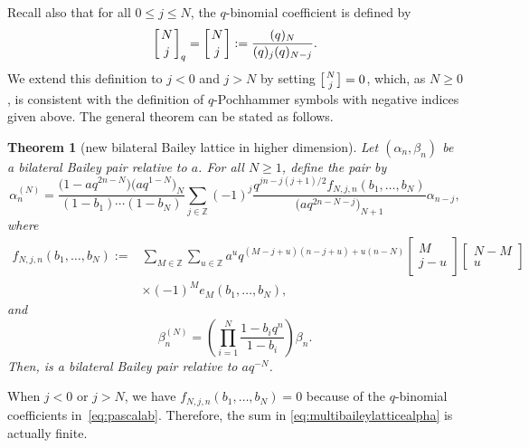 \documentclass[pdftex]{sigma}
\numberwithin{equation}{section}
\newtheorem{Theorem}{Theorem}[section]
\newcommand{\field}[1]{\mathbb{#1}}
\newcommand{\Z}{\field{Z}}
\begin{document}
Recall also that for all $0\leq j \leq N$, the $q$-binomial coefficient is defined by
\begin{equation*}\left[{N\atop j}\right]_q=\left[{N\atop j}\right]:=\frac{(q)_N}{(q)_j(q)_{N-j}}.
\end{equation*}
We extend this definition to $j<0$ and $j>N$ by setting $\bigl[{N\atop j}\bigr]=0$, which, as $N\geq0$, is consistent with the definition of $q$-Pochhammer symbols with negative indices given above.
The general theorem can be stated as follows.

\begin{Theorem}[new bilateral Bailey lattice in higher dimension]\label{thm:multibaileylattice}
Let $(\alpha_n, \beta_n)$ be a bilateral Bailey pair relative to $a$. For all $N\geq 1$, define the pair  by
\begin{equation}
\alpha^{(N)}_n=\frac{\bigl(1-aq^{2n-N}\bigr)\bigl(aq^{1-N}\bigr)_N}{(1-b_1)\cdots(1-b_N)}\sum_{j \in \Z}(-1)^j\frac{q^{jn-j(j+1)/2}f_{N,j,n}(b_1,\ldots,b_N)}{\bigl(aq^{2n-N-j}\bigr)_{N+1}} \alpha_{n-j},\label{eq:multibaileylatticealpha}
\end{equation}
where
\begin{align}
f_{N,j,n}(b_1,\ldots,b_N) :={}& \sum_{M \in \Z} \sum_{u \in \Z} a^{u}q^{(M-j+u)(n-j+u)+u(n-N)} \begin{bmatrix}
M\\
j-u
\end{bmatrix} \begin{bmatrix}
N-M\\
u
\end{bmatrix}\nonumber\\
&\times (-1)^Me_M(b_1, \dots , b_N),\label{eq:pascalab}
\end{align}
and
\begin{equation}
\beta^{(N)}_n=\left(\prod_{i=1}^N \frac{1-b_iq^n}{1-b_i}\right)\beta_n.\label{eq:multibaileylatticebeta}
\end{equation}
Then,  is a bilateral Bailey pair relative to $aq^{-N}$.
\end{Theorem}

\begin{Remark}
When $j<0$ or $j > N$, we have $f_{N,j,n}(b_1,\ldots,b_N) =0$ because of the $q$-binomial coefficients in~\eqref{eq:pascalab}. Therefore, the sum in \eqref{eq:multibaileylatticealpha} is actually finite.
\end{Remark}
\end{document}

